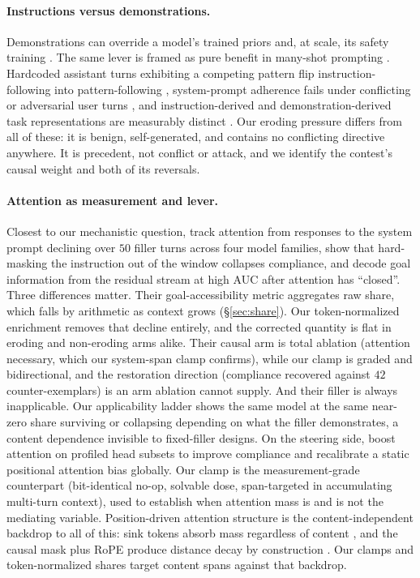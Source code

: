 \documentclass{article}
\begin{document}
\paragraph{Instructions versus demonstrations.}
Demonstrations can override a model's trained priors \citep{wei2023icldifferently} and, at
scale, its safety training \citep{anil2024manyshot}. The same lever is framed as pure benefit in
many-shot prompting \citep{agarwal2024manyshot}. Hardcoded assistant turns exhibiting a
competing pattern flip instruction-following into pattern-following
\citep{camassa2026instructioninduction}, system-prompt adherence fails under conflicting or
adversarial user turns \citep{mu2025systemprompt}, and instruction-derived and
demonstration-derived task representations are measurably distinct
\citep{davidson2025taskrepresentation}. Our eroding pressure differs from all of these: it is
benign, self-generated, and contains no conflicting directive anywhere. It is precedent, not
conflict or attack, and we identify the contest's causal weight and both of its reversals.

\paragraph{Attention as measurement and lever.}
Closest to our mechanistic question, \citet{dongre2026attentioncloses} track attention from
responses to the system prompt declining over $50$ filler turns across four model families, show
that hard-masking the instruction out of the window collapses compliance, and decode goal
information from the residual stream at high AUC after attention has ``closed''. Three
differences matter. Their goal-accessibility metric aggregates raw share, which falls by
arithmetic as context grows (\S\ref{sec:share}). Our token-normalized enrichment removes that
decline entirely, and the corrected quantity is flat in eroding and non-eroding arms alike.
Their causal arm is total ablation (attention necessary, which our system-span clamp
confirms), while our clamp is graded and bidirectional, and the restoration direction
(compliance recovered against $42$ counter-exemplars) is an arm ablation cannot supply. And
their filler is always inapplicable. Our applicability ladder shows the same model at the same
near-zero share surviving or collapsing depending on what the filler demonstrates, a content
dependence invisible to fixed-filler designs. On the steering side, \citet{zhang2023pasta} boost
attention on profiled head subsets to improve compliance and \citet{hsieh2024foundinmiddle}
recalibrate a static positional attention bias globally. Our clamp is the measurement-grade
counterpart (bit-identical no-op, solvable dose, span-targeted in accumulating multi-turn
context), used to establish when attention mass is and is not the mediating variable.
Position-driven attention structure is the content-independent backdrop to all of this: sink
tokens absorb mass regardless of content \citep{xiao2023streamingllm,gu2024attentionsink}, and
the causal mask plus RoPE produce distance decay by construction \citep{wu2025positionbias}.
Our clamps and token-normalized shares target content spans against that backdrop.
\end{document}
